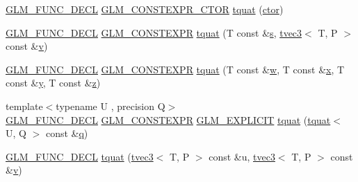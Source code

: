 \begin{DoxyCompactItemize}
\mbox{\hyperlink{setup_8hpp_ab2d052de21a70539923e9bcbf6e83a51}{G\+L\+M\+\_\+\+F\+U\+N\+C\+\_\+\+D\+E\+CL}} \mbox{\hyperlink{setup_8hpp_ad34178a09666081abdb573c14d1f4a5a}{G\+L\+M\+\_\+\+C\+O\+N\+S\+T\+E\+X\+P\+R\+\_\+\+C\+T\+OR}} \mbox{\hyperlink{structglm_1_1tquat_a8a907726f9a12c025b8dbb572e951e36}{tquat}} (\mbox{\hyperlink{namespaceglm_a807df837905ec286f806a536af03b57f}{ctor}})
\item 
\mbox{\hyperlink{setup_8hpp_ab2d052de21a70539923e9bcbf6e83a51}{G\+L\+M\+\_\+\+F\+U\+N\+C\+\_\+\+D\+E\+CL}} \mbox{\hyperlink{setup_8hpp_a08b807947b47031d3a511f03f89645ad}{G\+L\+M\+\_\+\+C\+O\+N\+S\+T\+E\+X\+PR}} \mbox{\hyperlink{structglm_1_1tquat_aa8e343ea23faf2cada6fc99d8e6eb597}{tquat}} (T const \&\mbox{\hyperlink{glad_8h_af1b1d5edfea6a34daee7389b1b5810ad}{s}}, \mbox{\hyperlink{structglm_1_1tvec3}{tvec3}}$<$ T, P $>$ const \&\mbox{\hyperlink{glad_8h_a14cfbe2fc2234f5504618905b69d1e06}{v}})
\item 
\mbox{\hyperlink{setup_8hpp_ab2d052de21a70539923e9bcbf6e83a51}{G\+L\+M\+\_\+\+F\+U\+N\+C\+\_\+\+D\+E\+CL}} \mbox{\hyperlink{setup_8hpp_a08b807947b47031d3a511f03f89645ad}{G\+L\+M\+\_\+\+C\+O\+N\+S\+T\+E\+X\+PR}} \mbox{\hyperlink{structglm_1_1tquat_ace891412cac049ef9bbafe069779a2c2}{tquat}} (T const \&\mbox{\hyperlink{glad_8h_a1d0296e9e835f2e1ee17634af95fc1ec}{w}}, T const \&\mbox{\hyperlink{glad_8h_a92d0386e5c19fb81ea88c9f99644ab1d}{x}}, T const \&\mbox{\hyperlink{glad_8h_a66ddd433d2cacfe27f5906b7e86faeed}{y}}, T const \&\mbox{\hyperlink{glad_8h_acb78bf1972d3eaf07da34ff2e0a2f133}{z}})
\item 
{\footnotesize template$<$typename U , precision Q$>$ }\\\mbox{\hyperlink{setup_8hpp_ab2d052de21a70539923e9bcbf6e83a51}{G\+L\+M\+\_\+\+F\+U\+N\+C\+\_\+\+D\+E\+CL}} \mbox{\hyperlink{setup_8hpp_a08b807947b47031d3a511f03f89645ad}{G\+L\+M\+\_\+\+C\+O\+N\+S\+T\+E\+X\+PR}} \mbox{\hyperlink{setup_8hpp_a6c74f5a5e7b134ab69023ff9a30d4d5d}{G\+L\+M\+\_\+\+E\+X\+P\+L\+I\+C\+IT}} \mbox{\hyperlink{structglm_1_1tquat_ad431b0f391ccc1e5d89f12306dc00114}{tquat}} (\mbox{\hyperlink{structglm_1_1tquat}{tquat}}$<$ U, Q $>$ const \&\mbox{\hyperlink{glad_8h_a514729309336df22bcc8eda979d6ced4}{q}})
\item 
\mbox{\hyperlink{setup_8hpp_ab2d052de21a70539923e9bcbf6e83a51}{G\+L\+M\+\_\+\+F\+U\+N\+C\+\_\+\+D\+E\+CL}} \mbox{\hyperlink{structglm_1_1tquat_a5c680cd9a6e7de9e5b0fc2e9e096e6a7}{tquat}} (\mbox{\hyperlink{structglm_1_1tvec3}{tvec3}}$<$ T, P $>$ const \&u, \mbox{\hyperlink{structglm_1_1tvec3}{tvec3}}$<$ T, P $>$ const \&\mbox{\hyperlink{glad_8h_a14cfbe2fc2234f5504618905b69d1e06}{v}})

\end{DoxyCompactItemize}
